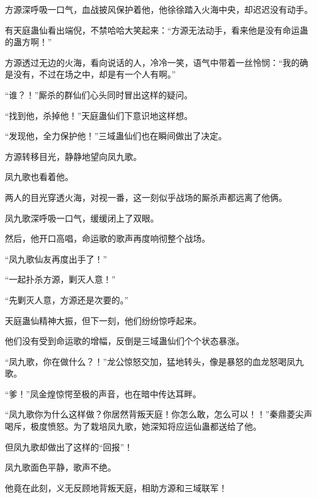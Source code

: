 \begin{this_body}
方源深呼吸一口气，血战披风保护着他，他徐徐踏入火海中央，却迟迟没有动手。

有天庭蛊仙看出端倪，不禁哈哈大笑起来：“方源无法动手，看来他是没有命运蛊的蛊方啊！”

方源透过无边的火海，看向说话的人，冷冷一笑，语气中带着一丝怜悯：“我的确是没有，不过在场之中，却是有一个人有啊。”

“谁？！”厮杀的群仙们心头同时冒出这样的疑问。

“找到他，杀掉他！”天庭蛊仙们下意识地这样想。

“发现他，全力保护他！”三域蛊仙们也在瞬间做出了决定。

方源转移目光，静静地望向凤九歌。

凤九歌也看着他。

两人的目光穿透火海，对视一番，这一刻似乎战场的厮杀声都远离了他俩。

凤九歌深呼吸一口气，缓缓闭上了双眼。

然后，他开口高唱，命运歌的歌声再度响彻整个战场。

“凤九歌仙友再度出手了！”

“一起扑杀方源，剿灭人意！”

“先剿灭人意，方源还是次要的。”

天庭蛊仙精神大振，但下一刻，他们纷纷惊呼起来。

他们没有受到命运歌的增幅，反倒是三域蛊仙们个个状态暴涨。

“凤九歌，你在做什么？！”龙公惊怒交加，猛地转头，像是暴怒的血龙怒喝凤九歌。

“爹！”凤金煌惊愕至极的声音，也在暗中传达耳畔。

“凤九歌你为什么这样做？你居然背叛天庭！你怎么敢，怎么可以！！”秦鼎菱尖声喝斥，极度愤怒。为了栽培凤九歌，她深知将应运仙蛊都送给了他。

但凤九歌却做出了这样的“回报”！

凤九歌面色平静，歌声不绝。

他竟在此刻，义无反顾地背叛天庭，相助方源和三域联军！

\end{this_body}

